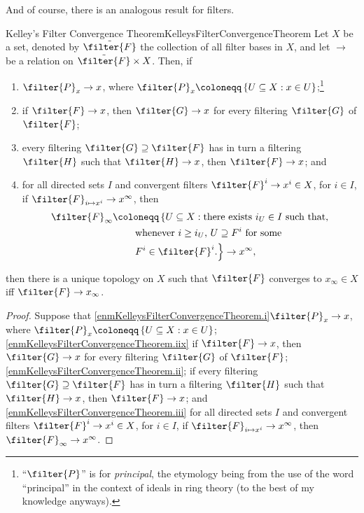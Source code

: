 And of course, there is an analogous result for filters.
\begin{thm}{Kelley's Filter Convergence Theorem}{KelleysFilterConvergenceTheorem}
Let $X$ be a set, denoted by $\tilde{\filter{F}}$ the collection of all filter bases in $X$, and let $\to$ be a relation on $\tilde{\filter{F}}\times X$.  Then, if
\begin{enumerate}
\item \label{enmKelleysFilterConvergenceTheorem.i}$\filter{P}_x\to x$, where $\filter{P}_x\coloneqq \left\{ U\subseteq X:x\in U\right\}$;\footnote{``$\filter{P}$'' is for \emph{principal}, the etymology being from the use of the word ``principal'' in the context of ideals in ring theory (to the best of my knowledge anyways).}
\item \label{enmKelleysFilterConvergenceTheorem.iix}if $\filter{F}\to x$, then $\filter{G}\to x$ for every filtering $\filter{G}$ of $\filter{F}$;
\item \label{enmKelleysFilterConvergenceTheorem.ii}every filtering $\filter{G}\supseteq \filter{F}$ has in turn a filtering $\filter{H}$ such that $\filter{H}\to x$, then $\filter{F}\to x$; and
\item \label{enmKelleysFilterConvergenceTheorem.iii}for all directed sets $I$ and convergent filters $\filter{F}^i\to x^i\in X$, for $i\in I$, if $\filter{F}_{i\mapsto x^i}\to x^\infty$, then
\intomargin
\begin{equation}
\begin{split}
\filter{F}_\infty & \coloneqq \left\{ U\subseteq X:\text{there exists }i_U\in I\text{ such that,}\right. \\
& \qquad \left. \text{whenever }i\geq i_U\text{, }U\supseteq F^i\text{ for some}\right. \\ & \qquad \left. F^i\in \filter{F}^i\text{.}\right\} \to x^\infty ,
\end{split}
\end{equation}
\end{enumerate}
then there is a unique topology on $X$ such that $\filter{F}$ converges to $x_\infty \in X$ iff $\filter{F}\to x_\infty$.
\begin{proof}
Suppose that \cref{enmKelleysFilterConvergenceTheorem.i}$\filter{P}_x\to x$, where $\filter{P}_x\coloneqq \left\{ U\subseteq X:x\in U\right\}$; \cref{enmKelleysFilterConvergenceTheorem.iix} if $\filter{F}\to x$, then $\filter{G}\to x$ for every filtering $\filter{G}$ of $\filter{F}$; \cref{enmKelleysFilterConvergenceTheorem.ii}; if every filtering $\filter{G}\supseteq \filter{F}$ has in turn a filtering $\filter{H}$ such that $\filter{H}\to x$, then $\filter{F}\to x$; and \cref{enmKelleysFilterConvergenceTheorem.iii} for all directed sets $I$ and convergent filters $\filter{F}^i\to x^i\in X$, for $i\in I$, if $\filter{F}_{i\mapsto x^i}\to x^\infty$, then $\filter{F}_\infty \to x^\infty$.


\end{proof}
\end{thm}
